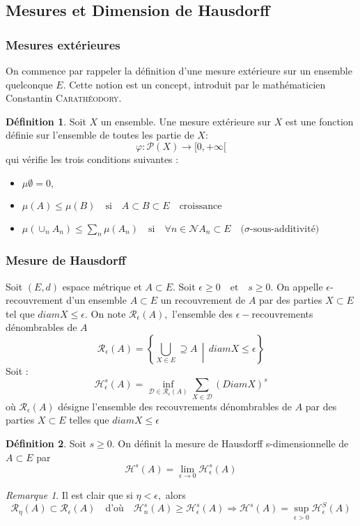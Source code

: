 \documentclass[12pt,a4paper]{report}
\theoremstyle{plain}
\theoremstyle{plain}
\theoremstyle{definition}
\newtheorem{definition}{Définition}
\theoremstyle{remark}
\newtheorem*{rmq}{Remarque}
\newcommand{\enstq}[2]{\left\{#1\,\middle|\,#2\right\}}
\newcommand{\N}[1]{\mathcal{N}}
\newcommand{\textm}[1]{\quad \text{#1} \quad}
\begin{document}
	\subsection{Mesures et Dimension de Hausdorff}
	\subsubsection{Mesures extérieures}
On commence par rappeler la définition d'une mesure extérieure sur un ensemble quelconque $E$. Cette notion est un concept, introduit par le mathématicien Constantin \textsc{Carathéodory}. 

\begin{definition}
Soit $X$ un ensemble. Une mesure extérieure sur $X$ est une fonction définie sur l'ensemble de toutes les partie de $X$:
\[\varphi : \mathcal{P}(X) \longrightarrow [0, +\infty[\]
qui vérifie les trois conditions suivantes :
\begin{itemize}
\item $\mu \emptyset = 0,$
\item $\mu(A)\leq \mu (B) \textm{si} A\subset B \subset E \textm{croissance}$
\item $\mu (\cup_n A_n) \leq \sum_n \mu (A_n) \textm{si} \forall n \in \N, A_n \subset E \textm{($\sigma$-sous-additivité)}$
\end{itemize}
\end{definition}

	\subsubsection{Mesure de Hausdorff}
Soit $(E,d)$ espace métrique et $A \subset E.$ Soit $\epsilon \geq 0 \textm{et} s \geq 0.$ On appelle $\epsilon$-recouvrement d'un ensemble $A \subset E$ un recouvrement de $A$ par des parties $X \subset E$ tel que $diam X \leq \epsilon.$ On note $\mathcal{R}_\epsilon(A),$ l'ensemble des $\epsilon-$recouvrements dénombrables de $A$
\[\mathcal{R}_\epsilon (A)= \enstq{\bigcup_{X \in E}\supseteq A}{diam X \leq \epsilon}\]
Soit :
\[\mathcal{H}_\epsilon^s (A) = \inf_{\mathcal{D}\in \mathcal{R}_\epsilon(A)}\sum_{X \in \mathcal{D}}(Diam X)^s\]
où $\mathcal{R}_\epsilon (A)$ désigne l'ensemble des recouvrements dénombrables de $A$ par des parties $X \subset E$ telles que $diam X \leq \epsilon$

\begin{definition}
Soit $s \geq 0.$ On définit la mesure de Hausdorff s-dimensionnelle de $A \subset E$ par
\[\mathcal{H}^s(A) = \lim\limits_{\epsilon \rightarrow 0} \mathcal{H}_\epsilon^s(A)\]
\end{definition}
\begin{rmq}
Il est clair que si $\eta < \epsilon,$ alors \[\mathcal{R}_\eta (A) \subset \mathcal{R}_\epsilon(A) \textm{d'où} 
\mathcal{H}_n^s(A)\geq\mathcal{H}_\epsilon^s(A) \Rightarrow \mathcal{H}^s(A) = \sup_{\epsilon > 0}\mathcal{H}_\epsilon^S(A)\]
\end{rmq}
\end{document}
